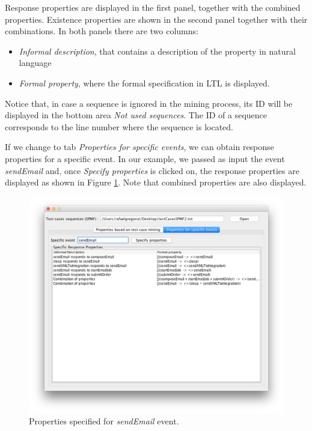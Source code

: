 Response properties are displayed in the first panel, together with the combined properties. Existence properties are shown in the second panel together with their combinations. In both panels there are two columns: 
\begin{itemize}
\item \textit{Informal description}, that contains a description of the property in natural language
\item \textit{Formal property}, where the formal specification in LTL is displayed.
\end{itemize}

Notice that, in case a sequence is ignored in the mining process, its ID will be displayed in the bottom area \textit{Not used sequences}. The ID of a sequence corresponds to the line number where the sequence is located.

If we change to tab \textit{Properties for specific events}, we can obtain response properties for a specific event. In our example, we passed as input the event \textit{sendEmail} and, once \textit{Specify properties} is clicked on, the response properties are displayed as shown in Figure \ref{propGenSpec}. Note that combined properties are also displayed.


\begin{figure}[htb]
\centering
\includegraphics[width=\textwidth]{figuras/propGenSpec}
\caption{\label{propGenSpec} Properties specified for \textit{sendEmail} event.}
\end{figure}


